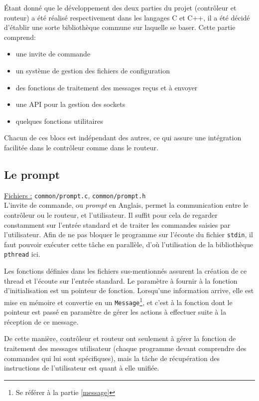 \documentclass[a4paper,11pt]{article}
\begin{document}
Étant donné que le développement des deux parties du projet (contrôleur et routeur) a été réalisé respectivement dans les langages C et C++, il a été décidé d'établir une sorte bibliothèque commune sur laquelle se baser. Cette partie comprend:
\begin{itemize}
 \item une invite de commande
 \item un système de gestion des fichiers de configuration
 \item des fonctions de traitement des messages reçus et à envoyer
 \item une API pour la gestion des sockets
 \item quelques fonctions utilitaires
\end{itemize}

Chacun de ces blocs est indépendant des autres, ce qui assure une intégration facilitée dans le contrôleur comme dans le routeur.

\subsection{Le prompt}

\underline{Fichiers :} \texttt{common/prompt.c}, \texttt{common/prompt.h}\\

L'invite de commande, ou \textit{prompt} en Anglais, permet la communication entre le contrôleur ou le routeur, et l'utilisateur. Il suffit pour cela de regarder constamment sur l'entrée standard et de traiter les commandes saisies par l'utilisateur. Afin de ne pas bloquer le programme sur l'écoute du fichier \texttt{stdin}, il faut pouvoir exécuter cette tâche en parallèle, d'où l'utilisation de la bibliothèque \texttt{pthread} ici.

Les fonctions définies dans les fichiers sus-mentionnés assurent la création de ce thread et l'écoute sur l'entrée standard. Le paramètre à fournir à la fonction d'initialisation est un pointeur de fonction. Lorsqu'une information arrive, elle est mise en mémoire et convertie en un \texttt{Message}\footnote{Se référer à la partie \ref{message}}, et c'est à la fonction dont le pointeur est passé en paramètre de gérer les actions à effectuer suite à la réception de ce message.

De cette manière, contrôleur et routeur ont seulement à gérer la fonction de traitement des messages utilisateur (chaque programme devant comprendre des commandes qui lui sont spécifiques), mais la tâche de récupération des instructions de l'utilisateur est quant à elle unifiée.
\end{document}
